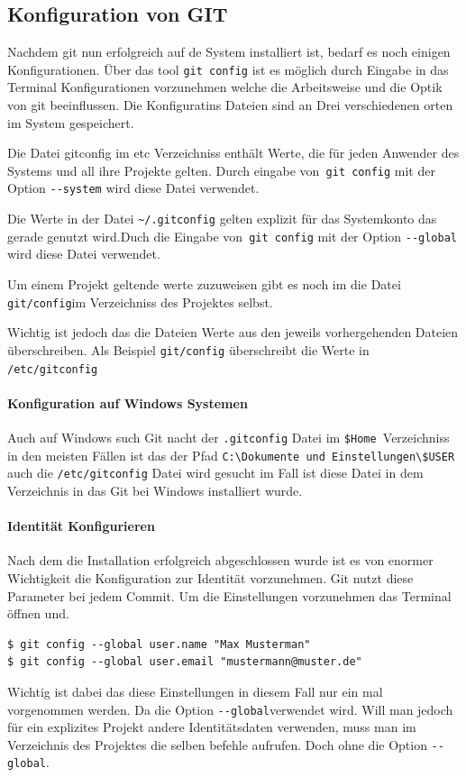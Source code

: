 \documentclass[12pt,a4paper,bibliography=totocnumbered,listof=totocnumbered]{scrartcl}
\begin{document}
\subsection{Konfiguration von GIT}
Nachdem git nun erfolgreich auf de System installiert ist, bedarf es noch einigen Konfigurationen. Über das tool \lstinline|git config| ist es möglich durch Eingabe in das Terminal Konfigurationen vorzunehmen welche die Arbeitsweise und die Optik von git beeinflussen. Die Konfiguratins Dateien sind an Drei verschiedenen orten im System
gespeichert. 
\begin{compactitem}
	\item Die Datei gitconfig im etc Verzeichniss enthält Werte, die für jeden Anwender des Systems und all ihre Projekte gelten. Durch eingabe von\lstinline| git config| mit der Option \lstinline|--system| wird diese Datei verwendet.
\item Die Werte in der Datei \lstinline|~/.gitconfig| gelten explizit für das Systemkonto das gerade genutzt wird.Duch die Eingabe von\lstinline| git config| mit der Option \lstinline|--global| wird diese Datei verwendet. 
\item Um einem Projekt geltende werte zuzuweisen gibt es noch im die Datei \lstinline|git/config|im Verzeichniss des Projektes selbst. 
\end{compactitem}
Wichtig ist jedoch das die Dateien Werte aus den jeweils vorhergehenden Dateien überschreiben. Als Beispiel \lstinline|git/config| überschreibt die Werte in \lstinline|/etc/gitconfig|

\paragraph{Konfiguration auf Windows Systemen}
Auch auf Windows such Git nacht der \lstinline|.gitconfig| Datei im  \lstinline|$Home |Verzeichniss in den meisten Fällen ist das 
der Pfad \lstinline|C:\Dokumente und Einstellungen\$USER| auch die \lstinline|/etc/gitconfig| Datei wird gesucht im Fall ist diese Datei in dem Verzeichnis in das Git bei Windows installiert wurde.

\paragraph{Identität Konfigurieren}
Nach dem die Installation erfolgreich abgeschlossen wurde ist es von enormer Wichtigkeit die Konfiguration zur Identität vorzunehmen. Git nutzt diese Parameter bei jedem Commit.
Um die Einstellungen vorzunehmen das Terminal öffnen und.
\begin{lstlisting}
$ git config --global user.name "Max Musterman"
$ git config --global user.email "mustermann@muster.de"
 \end{lstlisting}
Wichtig ist dabei das diese Einstellungen in diesem Fall nur ein 
mal vorgenommen werden. Da die Option \lstinline|--global|verwendet wird. Will man jedoch für ein explizites Projekt andere Identitätsdaten verwenden, muss man im Verzeichnis des Projektes die selben befehle aufrufen. Doch ohne die Option \lstinline|--global|.
\end{document}
